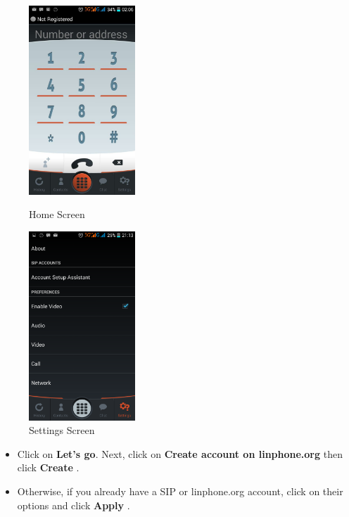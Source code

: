 \documentclass[a4paper]{article}
\begin{document}
\begin{figure}[h]
  \centering
  \begin{minipage}[h]{0.4\textwidth}
    \includegraphics[width=40mm, scale=0.5]{pictures/home.png}
    \caption{Home Screen}
  \end{minipage}
  \hfill
  \begin{minipage}[h]{0.4\textwidth}
    \includegraphics[width=40mm, scale=0.5]{pictures/settings.png}
    \caption{Settings Screen}
  \end{minipage}
\end{figure}

\begin{itemize}
\item Click on \textbf{Let's go}. Next, click on \textbf{Create account on linphone.org} then click \textbf{Create} . \\
\item Otherwise, if you already have a SIP or linphone.org account, click on their options and click \textbf{Apply} .
\end{itemize}
\end{document}
